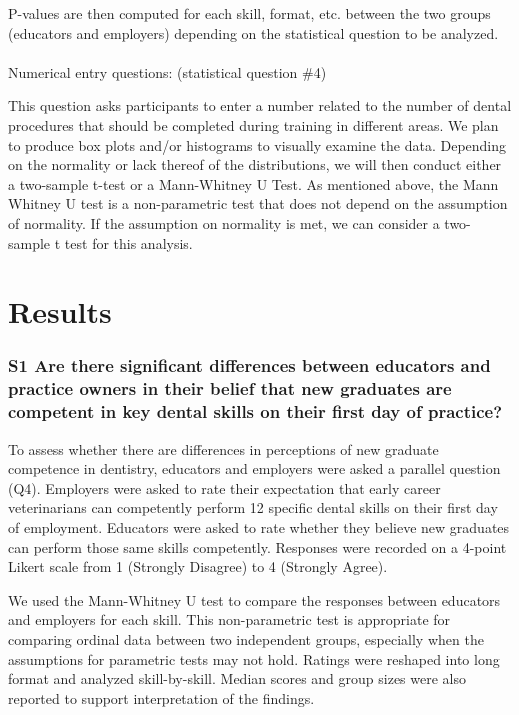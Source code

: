 \documentclass[
  11pt,
  letterpaper,
  DIV=11,
  numbers=noendperiod]{scrartcl}
\makeatletter
\let\oldparagraph\paragraph
\renewcommand{\paragraph}{
    \@ifstar
      \xxxParagraphStar
      \xxxParagraphNoStar
  }
\newcommand{\xxxParagraphStar}[1]{\oldparagraph*{#1}\mbox{}}
\newcommand{\xxxParagraphNoStar}[1]{\oldparagraph{#1}\mbox{}}
\numberwithin{figure}{section}
\makeatother
\begin{document}
P-values are then computed for each skill, format, etc. between the two
groups (educators and employers) depending on the statistical question
to be analyzed.

\paragraph{Numerical entry questions: (statistical question
\#4)}\label{numerical-entry-questions-statistical-question-4}

This question asks participants to enter a number related to the number
of dental procedures that should be completed during training in
different areas. We plan to produce box plots and/or histograms to
visually examine the data. Depending on the normality or lack thereof of
the distributions, we will then conduct either a two-sample t-test or a
Mann-Whitney U Test. As mentioned above, the Mann Whitney U test is a
non-parametric test that does not depend on the assumption of normality.
If the assumption on normality is met, we can consider a two-sample t
test for this analysis.

\section{Results}\label{results}

\subsubsection{S1 Are there significant differences between educators
and practice owners in their belief that new graduates are competent in
key dental skills on their first day of
practice?}\label{s1-are-there-significant-differences-between-educators-and-practice-owners-in-their-belief-that-new-graduates-are-competent-in-key-dental-skills-on-their-first-day-of-practice}

To assess whether there are differences in perceptions of new graduate
competence in dentistry, educators and employers were asked a parallel
question (Q4). Employers were asked to rate their expectation that early
career veterinarians can competently perform 12 specific dental skills
on their first day of employment. Educators were asked to rate whether
they believe new graduates can perform those same skills competently.
Responses were recorded on a 4-point Likert scale from 1 (Strongly
Disagree) to 4 (Strongly Agree).

We used the Mann-Whitney U test to compare the responses between
educators and employers for each skill. This non-parametric test is
appropriate for comparing ordinal data between two independent groups,
especially when the assumptions for parametric tests may not hold.
Ratings were reshaped into long format and analyzed skill-by-skill.
Median scores and group sizes were also reported to support
interpretation of the findings.
\end{document}
